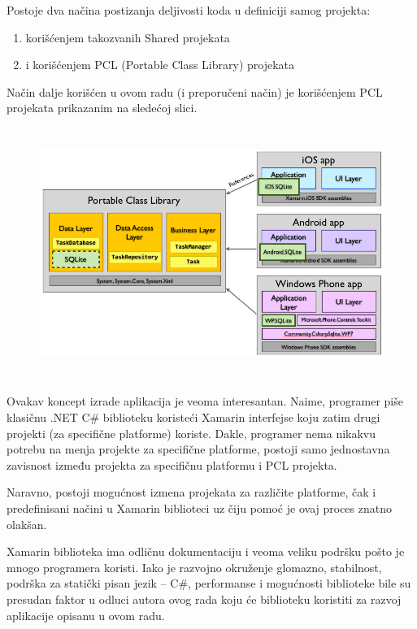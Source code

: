 \documentclass[a4paper]{article}
\newcommand\liststyleLiii{%
\renewcommand\theenumi{\arabic{enumi}}
\renewcommand\theenumii{\arabic{enumii}}
\renewcommand\theenumiii{\arabic{enumiii}}
\renewcommand\theenumiv{\arabic{enumiv}}
\renewcommand\labelenumi{\theenumi.}
\renewcommand\labelenumii{\theenumii.}
\renewcommand\labelenumiii{\theenumiii.}
\renewcommand\labelenumiv{\theenumiv.}
}
\begin{document}
Postoje dva načina postizanja deljivosti koda u definiciji samog
projekta:

\liststyleLiii
\begin{enumerate}
\item korišćenjem takozvanih Shared projekata
\item i korišćenjem PCL (Portable Class Library) projekata
\end{enumerate}
Način dalje korišćen u ovom radu (i preporučeni način) je korišćenjem
PCL projekata prikazanim na sledećoj slici.


\bigskip



\begin{figure}
\centering
\includegraphics[width=135.2mm,height=81.72mm]{msc-img11.png}
\end{figure}
Ovakav koncept izrade aplikacija je veoma interesantan. Naime, programer
piše klasičnu .NET C\# biblioteku koristeći Xamarin interfejse koju
zatim drugi projekti (za specifične platforme) koriste. Dakle,
programer nema nikakvu potrebu na menja projekte za specifične
platforme, postoji samo jednostavna zavisnost između projekta za
specifičnu platformu i PCL projekta.

Naravno, postoji mogućnost izmena projekata za različite platforme, čak
i predefinisani načini u Xamarin biblioteci uz čiju pomoć je ovaj
proces znatno olakšan.

Xamarin biblioteka ima odličnu dokumentaciju i veoma veliku podršku
pošto je mnogo programera koristi. Iako je razvojno okruženje glomazno,
stabilnost, podrška za statički pisan jezik – C\#, performanse i
mogućnosti biblioteke bile su presudan faktor u odluci autora ovog rada
koju će biblioteku koristiti za razvoj aplikacije opisanu u ovom radu.
\end{document}

